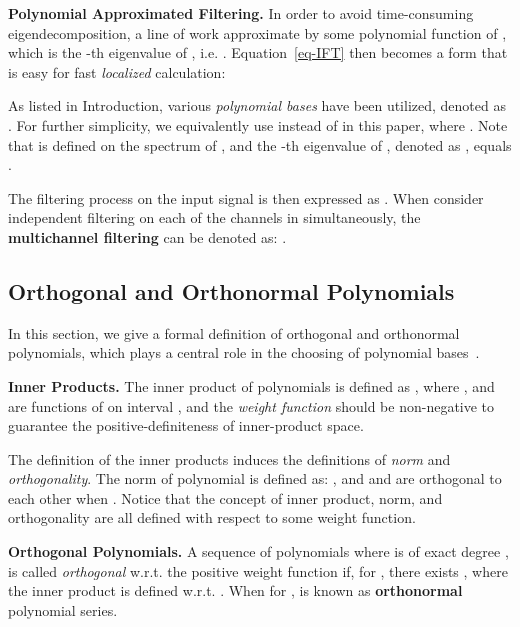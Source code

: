   


 








\textbf{Polynomial Approximated Filtering.\quad}
In order to avoid time-consuming eigendecomposition,
a line of work approximate  
 by 
some polynomial function of , 
which is the -th eigenvalue of , 
i.e. 
. 
Equation~\eqref{eq-IFT} then becomes a form that is easy for fast
{\textit{localized}} calculation:

As listed in Introduction, 
various \textit{polynomial bases} have been utilized, 
denoted as . 
For further simplicity, 
we equivalently use  instead of  in this paper, where 
. 
Note that  is defined on the spectrum of , 
and the -th eigenvalue of , denoted as , equals .


The filtering process on the input signal  is then expressed as 
.
When consider 
independent filtering on each of the  channels in  simultaneously, the \textbf{multichannel filtering} can be denoted as:   
.






%
 \subsection{Orthogonal and Orthonormal  Polynomials}

In this section, we give a formal definition of orthogonal and orthonormal polynomials, which plays a central role in the choosing of polynomial bases~\cite{simon2014spectral}.



\textbf{Inner Products.}
\label{para:inner_product}
The inner product of polynomials 
is defined as 
,
where ,  and  are functions of  on interval , 
and the \textit{weight function}  should be non-negative 
to 
guarantee the 
positive-definiteness of inner-product space.



The definition of the inner products induces 
the definitions of \textit{norm} and \textit{orthogonality}.
The norm of polynomial  is defined as: 
,
and  and  are orthogonal to each other when 
. Notice that the concept of inner product, norm, and orthogonality
are all defined with respect to some weight function. 

\textbf{Orthogonal Polynomials.}
A sequence of polynomials  
where  is of exact degree , is called \textit{orthogonal} 
w.r.t. the positive weight function  if, 
for , there exists  
,
where the inner product  is defined w.r.t.
. When  for ,  
is known as \textbf{orthonormal} polynomial series.

